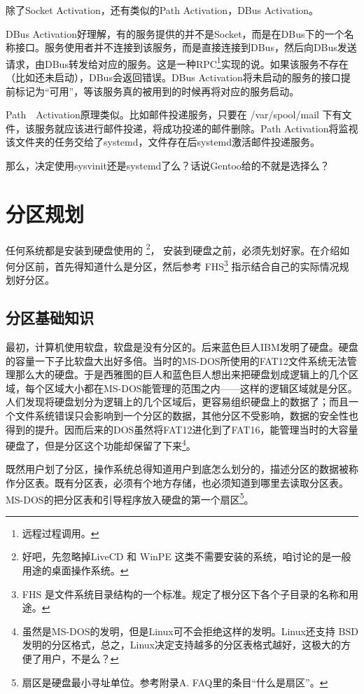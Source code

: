 除了Socket Activation，还有类似的Path Activation，DBus Activation。 

DBus Activation好理解，有的服务提供的并不是Socket，而是在DBus下的一个名称接口。服务使用者并不连接到该服务，而是直接连接到DBus，然后向DBus发送请求，由DBus转发给对应的服务。这是一种RPC\footnote{远程过程调用。}实现的说。如果该服务不存在（比如还未启动），DBus会返回错误。DBus Activation将未启动的服务的接口提前标记为“可用”，等该服务真的被用到的时候再将对应的服务启动。

Path　Activation原理类似。比如邮件投递服务，只要在 /var/spool/mail 下有文件，该服务就应该进行邮件投递，将成功投递的邮件删除。Path Activation将监视该文件夹的任务交给了systemd，文件存在后systemd激活邮件投递服务。

那么，决定使用sysvinit还是systemd了么？话说Gentoo给的不就是选择么？


\section{分区规划}
任何系统都是安装到硬盘使用的
\footnote{好吧，先忽略掉LiveCD 和  WinPE 这类不需要安装的系统，咱讨论的是一般用途的桌面操作系统。}，
安装到硬盘之前，必须先划好家。在介绍如何分区前，首先得知道什么是分区，然后参考
FHS\footnote{FHS 是文件系统目录结构的一个标准。规定了根分区下各个子目录的名称和用途。}
指示结合自己的实际情况规划好分区。

\subsection{分区基础知识}
最初，计算机使用软盘，软盘是没有分区的。后来蓝色巨人IBM发明了硬盘。硬盘的容量一下子比软盘大出好多倍。当时的MS-DOS所使用的FAT12文件系统无法管理那么大的硬盘。于是西雅图的巨人和蓝色巨人想出来把硬盘划成逻辑上的几个区域，每个区域大小都在MS-DOS能管理的范围之内——这样的逻辑区域就是分区。人们发现将硬盘划分为逻辑上的几个区域后，更容易组织硬盘上的数据了；而且一个文件系统错误只会影响到一个分区的数据，其他分区不受影响，数据的安全性也得到的提升。因而后来的DOS虽然将FAT12进化到了FAT16，能管理当时的大容量硬盘了，但是分区这个功能却保留了下来\footnote{虽然是MS-DOS的发明，但是Linux可不会拒绝这样的发明。Linux还支持 BSD 发明的分区格式，总之，Linux决定支持越多的分区表格式越好，这极大的方便了用户，不是么？}。

既然用户划了分区，操作系统总得知道用户到底怎么划分的，描述分区的数据被称作分区表。既有分区表，必须有个地方存储，也必须知道到哪里去读取分区表。MS-DOS的把分区表和引导程序放入硬盘的第一个扇区\footnote{扇区是硬盘最小寻址单位。参考附录A. FAQ里的条目“什么是扇区”。}。

